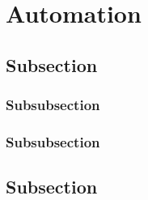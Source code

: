 
%
%

\section{Automation}
\label{sec:automation}





\subsection{Subsection}
\label{subsec:automation--subsection1}



\subsubsection{Subsubsection}
\label{subsubsec:automation--subsection1--subsubsection1}



\subsubsection{Subsubsection}
\label{subsubsec:automation--subsection1--subsubsection2}




\subsection{Subsection}
\label{subsec:automation--subsection2}




